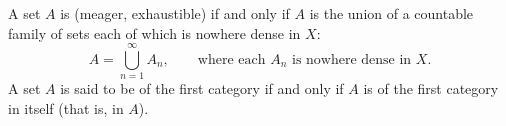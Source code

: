A set $A$ is  (meager, exhaustible) if and only if $A$ is the union of a countable family of sets each of which is nowhere dense in $X$:
\[
A = \bigcup_{n=1}^{\infty} A_n, \qquad \text{where each } A_n \text{ is nowhere dense in } X.
\]
A set $A$ is said to be of the first category if and only if $A$ is of the first category in itself (that is, in $A$).
